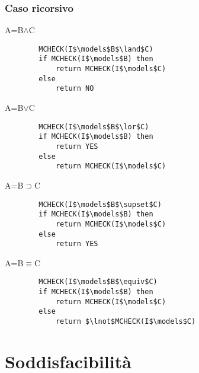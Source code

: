 \documentclass[../main.tex]{subfiles}
\begin{document}
    \subsubsection{Caso ricorsivo}
    A=B$\land$C
    \begin{lstlisting}
        MCHECK(I$\models$B$\land$C)
        if MCHECK(I$\models$B) then
            return MCHECK(I$\models$C)
        else
            return NO
    \end{lstlisting}

    \noindent
    A=B$\lor$C
    \begin{lstlisting}
        MCHECK(I$\models$B$\lor$C)
        if MCHECK(I$\models$B) then
            return YES
        else
            return MCHECK(I$\models$C)
    \end{lstlisting}

    \noindent
    A=B$\supset$C
    \begin{lstlisting}
        MCHECK(I$\models$B$\supset$C)
        if MCHECK(I$\models$B) then
            return MCHECK(I$\models$C)
        else
            return YES
    \end{lstlisting}

    \noindent
    A=B$\equiv$C
    \begin{lstlisting}
        MCHECK(I$\models$B$\equiv$C)
        if MCHECK(I$\models$B) then
            return MCHECK(I$\models$C)
        else
            return $\lnot$MCHECK(I$\models$C)
    \end{lstlisting}

    \section{Soddisfacibilità}
\end{document}
